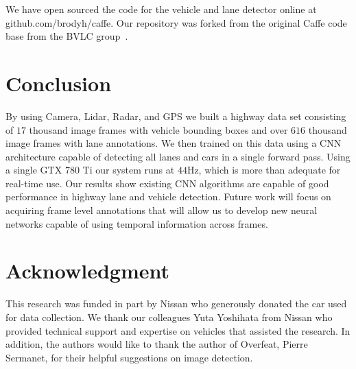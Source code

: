 \documentclass[journal]{IEEEtran}
\begin{document}
We have open sourced the code for the vehicle and lane detector online at github.com/brodyh/caffe. Our repository was forked from the original Caffe code base from the BVLC group~\cite{jia-2014}.

\section{Conclusion}
By using Camera, Lidar, Radar, and GPS we built a highway data set consisting of $17$ thousand image frames with vehicle bounding boxes and over $616$ thousand image frames with lane annotations. We then trained on this data using a CNN architecture capable of detecting all lanes and cars in a single forward pass. Using a single GTX 780 Ti our system runs at $44$Hz, which is more than adequate for real-time use. Our results show existing CNN algorithms are capable of good performance in highway lane and vehicle detection. Future work will focus on acquiring frame level annotations that will allow us to develop new neural networks capable of using temporal information across frames.































\section*{Acknowledgment}

This research was funded in part by Nissan who generously donated the car used for data collection. We thank our colleagues Yuta Yoshihata from Nissan who provided technical support and expertise on vehicles that assisted the research. In addition, the authors would like to thank the author of Overfeat, Pierre Sermanet, for their helpful suggestions on image detection. 
\end{document}
